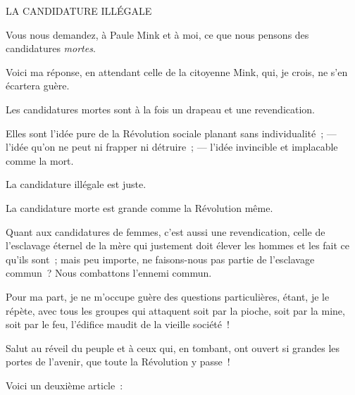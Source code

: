 \documentclass[french,twoside]{book} %
\newcommand{\salute}[1]{\bigbreak{#1}\par\medbreak}
\newcommand{\signed}[1]{\bigbreak\filbreak{\raggedleft #1\par}\medskip}
\newenvironment{quoteblock}%
  {\begin{quoting}}
  {\end{quoting}}
\newenvironment{quotebar}{%
    \def\FrameCommand{{\color{rubric!10!}\vrule width 0.5em} \hspace{0.9em}}%
    \def\OuterFrameSep{\itemsep} %
    \MakeFramed {\advance\hsize-\width \FrameRestore}
  }%
  {%
    \endMakeFramed
  }
\renewenvironment{quoteblock}%
  {%
    \savenotes
    \setstretch{0.9}
    \normalfont
    \begin{quotebar}
  }
  {%
    \end{quotebar}
    \spewnotes
  }
\begin{document}
\begin{quoteblock}
 LA CANDIDATURE ILLÉGALE 
\salute{Citoyens,}
 \noindent Vous nous demandez, à Paule Mink et à moi, ce que nous pensons des candidatures \emph{mortes}.\par
 Voici ma réponse, en attendant celle de la citoyenne Mink, qui, je crois, ne s’en écartera guère.\par
 Les candidatures mortes sont à la fois un drapeau et une revendication.\par
 Elles sont l’idée pure de la Révolution sociale planant sans individualité ; — l’idée qu’on ne peut ni frapper ni détruire ; — l’idée invincible et implacable comme la mort.\par
 La candidature illégale est juste.\par
 La candidature morte est grande comme la Révolution même.\par
 Quant aux candidatures de femmes, c’est aussi une revendication, celle de l’esclavage éternel de la mère qui justement doit élever les hommes et les fait ce qu’ils sont ; mais peu importe, ne faisons-nous pas partie de l’esclavage commun ? Nous combattons l’ennemi commun.\par
 Pour ma part, je ne m’occupe guère des questions particulières, étant, je le répète, avec tous les groupes qui attaquent soit par la pioche, soit par la mine, soit par le feu, l’édifice maudit de la vieille société !\par
 Salut au réveil du peuple et à ceux qui, en tombant, ont ouvert si grandes les portes de l’avenir, que toute la Révolution y passe !\par
 

\signed{L{\scshape ouise} M{\scshape ichel}.}
 \end{quoteblock}

 \noindent Voici un deuxième article :\par
\end{document}
